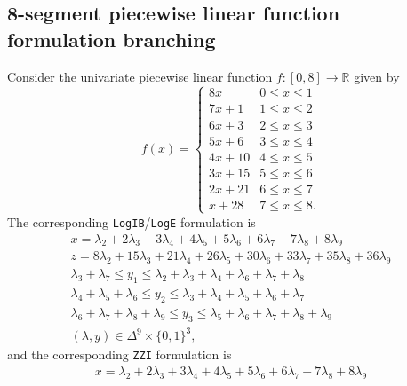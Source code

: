 \documentclass[opre,nonblindrev]{informs3} %
\newcommand{\bbR}{\mathbb{R}}
\newcommand{\ZZI}{\texttt{ZZI}}
\newcommand{\Log}{\texttt{LogE}}
\newcommand{\LogIB}{\texttt{LogIB}}
\begin{document}
\begin{APPENDICES}
\section{8-segment piecewise linear function formulation branching} \label{app:8-segment}
Consider the univariate piecewise linear function $f : [0,8] \to \bbR$ given by
\begin{equation} \label{eqn:pwl-example-8}
    f(x) = \begin{cases}
        8x      & 0 \leq x \leq 1 \\
        7x +  1 & 1 \leq x \leq 2 \\
        6x +  3 & 2 \leq x \leq 3 \\
        5x +  6 & 3 \leq x \leq 4 \\
        4x + 10 & 4 \leq x \leq 5 \\
        3x + 15 & 5 \leq x \leq 6 \\
        2x + 21 & 6 \leq x \leq 7 \\
         x + 28 & 7 \leq x \leq 8.
    \end{cases}
\end{equation}
The corresponding \LogIB{}/\Log{} formulation is
\begin{subequations} \label{eqn:log-8seg}
\begin{gather}
    x = \lambda_2 + 2\lambda_3 + 3\lambda_4 + 4\lambda_5 + 5\lambda_6 + 6\lambda_7 + 7\lambda_8 + 8\lambda_9 \\
    z = 8\lambda_2 + 15\lambda_3 + 21\lambda_4 + 26\lambda_5 + 30\lambda_6 + 33\lambda_7 + 35\lambda_8 + 36\lambda_9 \\
    \lambda_3 + \lambda_7 \leq y_1 \leq \lambda_2 + \lambda_3 + \lambda_4 + \lambda_6 + \lambda_7 + \lambda_8 \\
    \lambda_4 + \lambda_5 + \lambda_6 \leq y_2 \leq \lambda_3 + \lambda_4 + \lambda_5 + \lambda_6 + \lambda_7 \\
    \lambda_6 + \lambda_7 + \lambda_8 + \lambda_9 \leq y_3 \leq \lambda_5 + \lambda_6 + \lambda_7 + \lambda_8 + \lambda_9 \\
    (\lambda,y) \in \Delta^9 \times \{0,1\}^3,
\end{gather}
\end{subequations}
and the corresponding \ZZI{} formulation is
\begin{subequations} \label{eqn:zigzag-8seg}
\begin{gather}
    x = \lambda_2 + 2\lambda_3 + 3\lambda_4 + 4\lambda_5 + 5\lambda_6 + 6\lambda_7 + 7\lambda_8 + 8\lambda_9 \\

\end{gather}
\end{subequations}
\end{APPENDICES}
\end{document}
